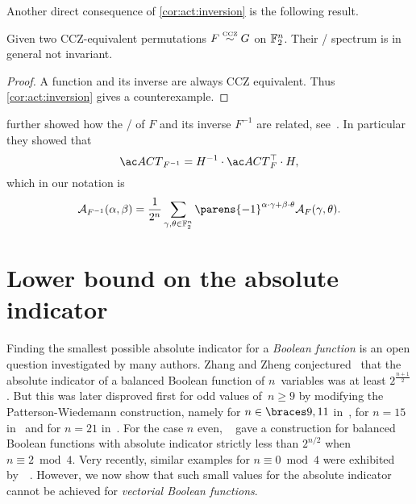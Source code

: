 Another direct consequence of \cref{cor:act:inversion} is the following result.
\begin{corollary}
    Given two CCZ-equivalent permutations $F \stackrel{\text{\tiny CCZ}}{\sim} G$ on $\mathbb{F}_2^n$.
    Their \ACT/ spectrum is in general not invariant.
\end{corollary}
\begin{proof}
    A function and its inverse are always CCZ equivalent.
    Thus \cref{cor:act:inversion} gives a counterexample.
\end{proof}

\citeauthor{DCC:ZhaZheIma00} further showed how the \ACT/ of $F$ and its inverse $F^{-1}$ are related, see~\cite[Corollary~1]{DCC:ZhaZheIma00}.
In particular they showed that
\begin{equation*}
    \ACT/_{F^{-1}} = H^{-1} \cdot \ACT/_{F}^\top \cdot H, %
\end{equation*}
which in our notation is
\begin{equation*}
    \AC{F^{-1}}(\alpha, \beta) = \frac{1}{2^n} \sum_{\gamma, \theta \in \F_2^n} \parens{-1}^{\iprod{\alpha}{\gamma} + \iprod{\beta}{\theta}} \AC{F}(\gamma, \theta).
\end{equation*}

\section{Lower bound on the absolute indicator}%
\label{sec:act:absolute_indicator}

Finding the smallest possible absolute indicator for a \emph{Boolean function} is an open question investigated by many authors.
Zhang and Zheng conjectured~\cite[Conjecture 1]{JUCS:ZhaZhe96} that the absolute indicator of a balanced Boolean function of $n$~variables was at least $2^{\frac{n+1}{2}}$.
But this was later disproved first for odd values of~$n \geqslant 9$ by modifying the Patterson-Wiedemann construction, namely for $n \in \set{9, 11}$ in~, for $n=15$ in~ and for $n=21$ in~.
For the case $n$ even, \citeauthor{TIT:TanMai18}~ gave a construction for balanced Boolean functions with absolute indicator strictly less than $2^{n/2}$ when $n \equiv 2 \bmod{4}$.
Very recently, similar examples for $n \equiv 0 \bmod{4}$ were exhibited by~\citeauthor{DCC:KavMaiTan19}~.
However, we now show that such small values for the absolute indicator cannot be achieved for \emph{vectorial Boolean functions}.

